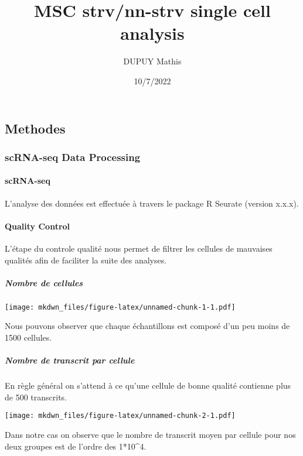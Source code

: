 \documentclass[
]{article}
\title{MSC strv/nn-strv single cell analysis}
\author{DUPUY Mathis}
\date{10/7/2022}
\begin{document}
\maketitle

\hypertarget{methodes}{%
\subsection{Methodes}\label{methodes}}

\hypertarget{scrna-seq-data-processing}{%
\subsubsection{scRNA-seq Data
Processing}\label{scrna-seq-data-processing}}

\hypertarget{scrna-seq}{%
\paragraph{scRNA-seq}\label{scrna-seq}}

L'analyse des données est effectuée à travers le package R Seurate
(version x.x.x).

\hypertarget{quality-control}{%
\paragraph{Quality Control}\label{quality-control}}

L'étape du controle qualité nous permet de filtrer les cellules de
mauvaises qualités afin de faciliter la suite des analyses.

\hypertarget{nombre-de-cellules}{%
\subparagraph{Nombre de cellules}\label{nombre-de-cellules}}

\texttt{[image: mkdwn\_files/figure-latex/unnamed-chunk-1-1.pdf]}

Nous pouvons observer que chaque échantillons est composé d'un peu moins
de 1500 cellules.

\hypertarget{nombre-de-transcrit-par-cellule}{%
\subparagraph{Nombre de transcrit par
cellule}\label{nombre-de-transcrit-par-cellule}}

En règle général on s'attend à ce qu'une cellule de bonne qualité
contienne plus de 500 transcrits.

\texttt{[image: mkdwn\_files/figure-latex/unnamed-chunk-2-1.pdf]}

Dans notre cas on observe que le nombre de transcrit moyen par cellule
pour nos deux groupes est de l'ordre des 1*10\^{}4.
\end{document}
